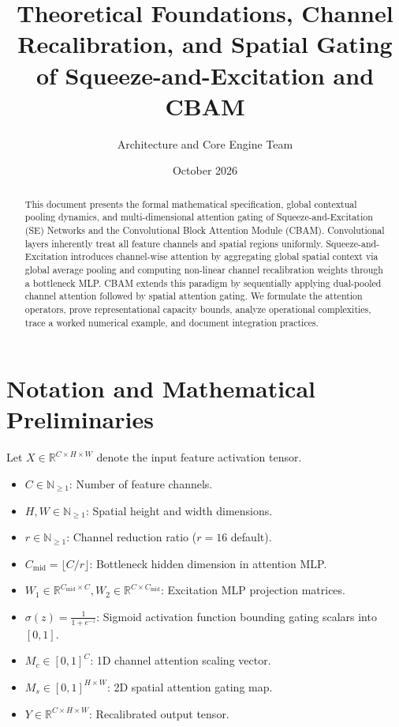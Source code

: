 \documentclass[11pt,a4paper]{article}
\title{\textbf{Theoretical Foundations, Channel Recalibration, and Spatial Gating of Squeeze-and-Excitation and CBAM}}
\author{Architecture and Core Engine Team}
\date{October 2026}
\theoremstyle{definition}
\begin{document}
\maketitle

\begin{abstract}
This document presents the formal mathematical specification, global contextual pooling dynamics, and multi-dimensional attention gating of Squeeze-and-Excitation (SE) Networks and the Convolutional Block Attention Module (CBAM). Convolutional layers inherently treat all feature channels and spatial regions uniformly. Squeeze-and-Excitation introduces channel-wise attention by aggregating global spatial context via global average pooling and computing non-linear channel recalibration weights through a bottleneck MLP. CBAM extends this paradigm by sequentially applying dual-pooled channel attention followed by spatial attention gating. We formulate the attention operators, prove representational capacity bounds, analyze operational complexities, trace a worked numerical example, and document integration practices.
\end{abstract}

\section{Notation and Mathematical Preliminaries}

Let $X \in \mathbb{R}^{C \times H \times W}$ denote the input feature activation tensor.

\begin{itemize}
    \item $C \in \mathbb{N}_{\ge 1}$: Number of feature channels.
    \item $H, W \in \mathbb{N}_{\ge 1}$: Spatial height and width dimensions.
    \item $r \in \mathbb{N}_{\ge 1}$: Channel reduction ratio ($r = 16$ default).
    \item $C_{\text{mid}} = \lfloor C / r \rfloor$: Bottleneck hidden dimension in attention MLP.
    \item $W_1 \in \mathbb{R}^{C_{\text{mid}} \times C}, W_2 \in \mathbb{R}^{C \times C_{\text{mid}}}$: Excitation MLP projection matrices.
    \item $\sigma(z) = \frac{1}{1 + e^{-z}}$: Sigmoid activation function bounding gating scalars into $[0, 1]$.
    \item $M_c \in [0, 1]^C$: 1D channel attention scaling vector.
    \item $M_s \in [0, 1]^{H \times W}$: 2D spatial attention gating map.
    \item $Y \in \mathbb{R}^{C \times H \times W}$: Recalibrated output tensor.
\end{itemize}
\end{document}

